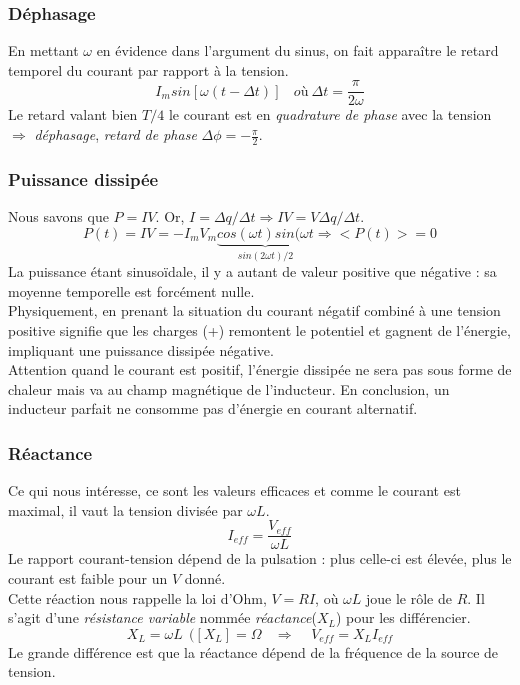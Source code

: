 \documentclass[british,french,11pt, a4paper, openany]{book}
\begin{document}
	\subsubsection{Déphasage}
	En mettant $\omega$ en évidence dans l'argument du sinus, on fait apparaître le retard temporel du courant par rapport à la tension.
	\begin{equation}
		I_m sin[\omega (t - \Delta t)]\ \ \ \ où\ \Delta t = \frac{\pi}{2 \omega}
	\end{equation}
	Le retard valant bien $T/4$ le courant est en \textit{quadrature de phase} avec la tension $\Rightarrow$ \textit{déphasage}, \textit{retard de phase} $\Delta\phi = - \frac{\pi}{2}$.
	
	\subsubsection{Puissance dissipée}
	Nous savons que $P = IV$. Or, $I = \Delta q / \Delta t \Rightarrow IV = V \Delta q / \Delta t $.
	\begin{equation}
		P(t) = IV = -I_mV_m \underbrace{cos(\omega t)sin(\omega t}_{sin(2\omega t)/2} \Rightarrow <P(t)> = 0
	\end{equation}
	La puissance étant sinusoïdale, il y a autant de valeur positive que négative : sa moyenne temporelle est forcément nulle.\\
	Physiquement, en prenant la situation du courant négatif combiné à une tension positive signifie que les charges (+) remontent le potentiel et gagnent de l'énergie, impliquant une puissance dissipée négative.\\
	Attention quand le courant est positif, l'énergie dissipée ne sera pas sous forme de chaleur mais va au champ magnétique de l'inducteur. En conclusion, un inducteur parfait ne consomme pas d'énergie en courant alternatif.
	
	\subsubsection{Réactance}
	Ce qui nous intéresse, ce sont les valeurs efficaces et comme le courant est maximal, il vaut la tension divisée par $\omega L$.
	\begin{equation}
		I_{eff} = \frac{V_{eff}}{\omega L}
	\end{equation}
	Le rapport courant-tension dépend de la pulsation : plus celle-ci est élevée, plus le courant est faible pour un $V$ donné.\\
	Cette réaction nous rappelle la loi d'Ohm, $V = RI$, où $\omega L$ joue le rôle de $R$. Il s'agit d'une \textit{résistance variable} nommée \textit{réactance}($X_L$) pour les différencier.
	\begin{equation}
		X_L = \omega L\ \ ([X_L] = \Omega\ \ \ \ \Rightarrow\ \ \ \ \ V_{eff} = X_LI_{eff}
	\end{equation}
	Le grande différence est que la réactance dépend de la fréquence de la source de tension.
	
\end{document}
